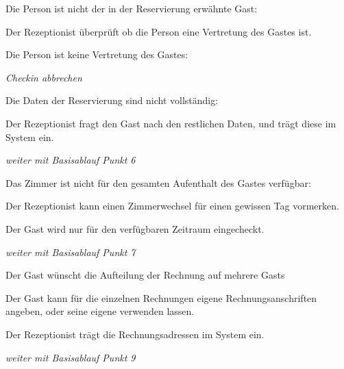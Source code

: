 \begin{longenum}
	\begin{longenum}
		\item Die Person ist nicht der in der \Gls{Reservierung} erwähnte Gast:
		\begin{longenum}
			\item Der \Gls{Rezeptionist} überprüft ob die Person eine Vertretung des \Gls{Gast}es ist.
			\begin{longenum}
				\item Die Person ist keine Vertretung des \Gls{Gast}es:
				\begin{longenum}
					\item \emph{\Gls{Checkin} abbrechen}
				\end{longenum}
			\end{longenum}
		\end{longenum}
	\end{longenum}
	\item
	\begin{longenum}
		\item Die Daten der \Gls{Reservierung} sind nicht vollständig:
		\begin{longenum}
			\item Der \Gls{Rezeptionist} fragt den \Gls{Gast} nach den restlichen Daten, und trägt diese im System ein.
			\item \emph{weiter mit Basisablauf Punkt 6}
		\end{longenum}
	\end{longenum}
	\item
	\begin{longenum}
		\item Das \Gls{Zimmer} ist nicht für den gesamten Aufenthalt des \Gls{Gast}es verfügbar:
		\begin{longenum}
			\item Der \Gls{Rezeptionist} kann einen \Gls{Zimmer}wechsel für einen gewissen Tag vormerken.
			\item Der \Gls{Gast} wird nur für den verfügbaren Zeitraum eingecheckt.
			\item \emph{weiter mit Basisablauf Punkt 7}
		\end{longenum}
	\end{longenum}
	\item
	\item
	\begin{longenum}
		\item Der \Gls{Gast} wünscht die Aufteilung der Rechnung auf mehrere \Glspl{Gast}
		\begin{longenum}
			\item Der \Gls{Gast} kann für die einzelnen Rechnungen eigene Rechnungsanschriften angeben, oder seine eigene verwenden lassen.
			\item Der \Gls{Rezeptionist} trägt die Rechnungsadressen im System ein.
			\item \emph{weiter mit Basisablauf Punkt 9}
		\end{longenum}
	\end{longenum}
	\item
\end{longenum}


